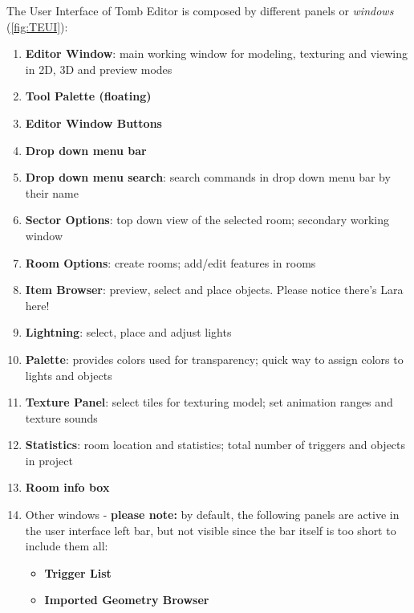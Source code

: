 The User Interface of Tomb Editor is composed by different panels or \emph{windows} (\ref{fig:TEUI}):

\begin{enumerate}
    \item \textbf{Editor Window}: main working window for modeling, texturing and viewing in 2D, 3D and preview modes
    \item \textbf{Tool Palette (floating)}
    \item \textbf{Editor Window Buttons}
    \item \textbf{Drop down menu bar}
    \item \textbf{Drop down menu search}: search commands in drop down menu bar by their name
    \item \textbf{Sector Options}: top down view of the selected room; secondary working window
    \item \textbf{Room Options}: create rooms; add/edit features in rooms
    \item \textbf{Item Browser}: preview, select and place objects. Please notice there's Lara here!
    \item \textbf{Lightning}: select, place and adjust lights
    \item \textbf{Palette}: provides colors used for transparency; quick way to assign colors to lights and objects
    \item \textbf{Texture Panel}: select tiles for texturing model; set animation ranges and texture sounds
    \item \textbf{Statistics}: room location and statistics; total number of triggers and objects in project
    \item \textbf{Room info box}
    \item Other windows - \textbf{please note:} by default, the following panels are active in the user interface left bar, but not visible since the bar itself is too short to include them all:
\begin{itemize}
    \item \textbf{Trigger List}
    \item \textbf{Imported Geometry Browser}
\end{itemize}

\end{enumerate}

